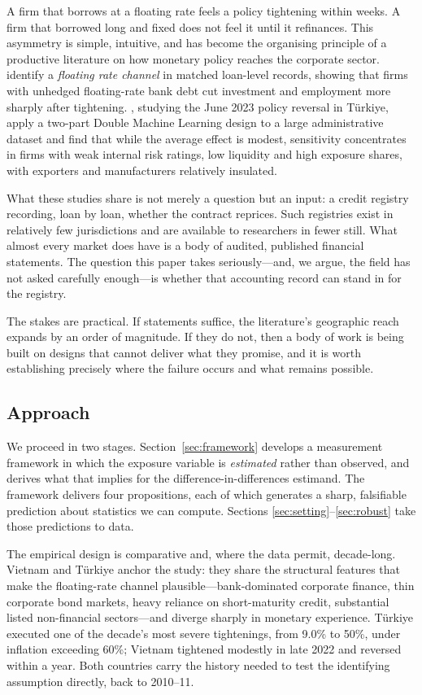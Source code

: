 \documentclass[review,12pt,authoryear]{elsarticle}
\theoremstyle{plain}
\theoremstyle{definition}
\begin{document}
A firm that borrows at a floating rate feels a policy tightening within weeks.
A firm that borrowed long and fixed does not feel it until it refinances. This
asymmetry is simple, intuitive, and has become the organising principle of a
productive literature on how monetary policy reaches the corporate sector.
\citet{ippolito2018} identify a \emph{floating rate channel} in matched
loan-level records, showing that firms with unhedged floating-rate bank debt cut
investment and employment more sharply after tightening. \citet{sengul2026},
studying the June 2023 policy reversal in T\"{u}rkiye, apply a two-part Double
Machine Learning design to a large administrative dataset and find that while
the average effect is modest, sensitivity concentrates in firms with weak
internal risk ratings, low liquidity and high exposure shares, with exporters
and manufacturers relatively insulated.

What these studies share is not merely a question but an input: a credit
registry recording, loan by loan, whether the contract reprices. Such registries
exist in relatively few jurisdictions and are available to researchers in fewer
still. What almost every market does have is a body of audited, published
financial statements. The question this paper takes seriously---and, we argue,
the field has not asked carefully enough---is whether that accounting record can
stand in for the registry.

The stakes are practical. If statements suffice, the literature's geographic
reach expands by an order of magnitude. If they do not, then a body of work is
being built on designs that cannot deliver what they promise, and it is worth
establishing precisely where the failure occurs and what remains possible.

\subsection{Approach}

We proceed in two stages. Section~\ref{sec:framework} develops a measurement
framework in which the exposure variable is \emph{estimated} rather than
observed, and derives what that implies for the difference-in-differences
estimand. The framework delivers four propositions, each of which generates a
sharp, falsifiable prediction about statistics we can compute. Sections
\ref{sec:setting}--\ref{sec:robust} take those predictions to data.

The empirical design is comparative and, where the data permit, decade-long.
Vietnam and T\"{u}rkiye anchor the study: they share the structural features
that make the floating-rate channel plausible---bank-dominated corporate
finance, thin corporate bond markets, heavy reliance on short-maturity credit,
substantial listed non-financial sectors---and diverge sharply in monetary
experience. T\"{u}rkiye executed one of the decade's most severe tightenings,
from 9.0\% to 50\%, under inflation exceeding 60\%; Vietnam tightened
modestly in late 2022 and reversed within a year. Both countries carry the
history needed to test the identifying assumption directly, back to 2010--11.
\end{document}
